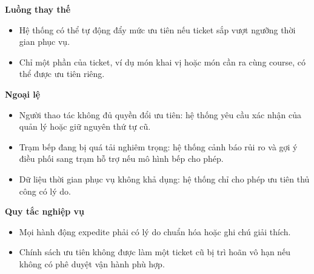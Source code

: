 \documentclass[11pt,a4paper]{article}
\begin{document}
\begin{usecasebox}[title={UC-KIT-03 --- Ưu tiên hàng chờ bếp và xử lý món gấp}]
    \textbf{Luồng thay thế}
    \begin{itemize}[leftmargin=1.8em]
  \item Hệ thống có thể tự động đẩy mức ưu tiên nếu ticket sắp vượt ngưỡng thời gian phục vụ.
  \item Chỉ một phần của ticket, ví dụ món khai vị hoặc món cần ra cùng course, có thể được ưu tiên riêng.
\end{itemize}

    \textbf{Ngoại lệ}
    \begin{itemize}[leftmargin=1.8em]
  \item Người thao tác không đủ quyền đổi ưu tiên: hệ thống yêu cầu xác nhận của quản lý hoặc giữ nguyên thứ tự cũ.
  \item Trạm bếp đang bị quá tải nghiêm trọng: hệ thống cảnh báo rủi ro và gợi ý điều phối sang trạm hỗ trợ nếu mô hình bếp cho phép.
  \item Dữ liệu thời gian phục vụ không khả dụng: hệ thống chỉ cho phép ưu tiên thủ công có lý do.
\end{itemize}

    \textbf{Quy tắc nghiệp vụ}
    \begin{itemize}[leftmargin=1.8em]
  \item Mọi hành động expedite phải có lý do chuẩn hóa hoặc ghi chú giải thích.
  \item Chính sách ưu tiên không được làm một ticket cũ bị trì hoãn vô hạn nếu không có phê duyệt vận hành phù hợp.
\end{itemize}
    \end{usecasebox}
\end{document}
